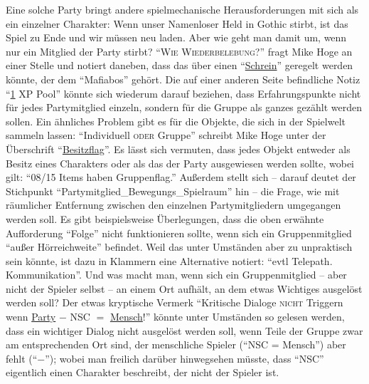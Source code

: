 \documentclass[a5paper,pagesize]{scrbook}
\begin{document}
Eine solche Party bringt andere spielmechanische Herausforderungen mit sich als ein einzelner Charakter:
Wenn unser Namenloser Held in Gothic stirbt, ist das Spiel zu Ende und wir müssen neu laden.
Aber wie geht man damit um, wenn nur ein Mitglied der Party stirbt?
\enquote{\textsc{Wie Wiederbelebung?}} fragt Mike Hoge an einer Stelle und notiert daneben, dass das über einen \enquote{\uline{Schrein}} geregelt werden könnte, der dem \enquote{Mafiabos} gehört.\autocite[S.~7]{orpheus_b_scribbles}
Die auf einer anderen Seite befindliche Notiz \enquote{\uline{1} XP Pool}\autocite[S.~8]{orpheus_b_scribbles} könnte sich wiederum darauf beziehen, dass Erfahrungspunkte nicht für jedes Partymitglied einzeln, sondern für die Gruppe als ganzes gezählt werden sollen.
Ein ähnliches Problem gibt es für die Objekte, die sich in der Spielwelt sammeln lassen:
\enquote{Individuell \textsc{oder} Gruppe} schreibt Mike Hoge unter der Überschrift \enquote{\uline{Besitzflag}}.
Es lässt sich vermuten, dass jedes Objekt entweder als Besitz eines Charakters oder als das der Party ausgewiesen werden sollte, wobei gilt:
\enquote{08/15 Items haben Gruppenflag.}\autocite[S.~9]{orpheus_b_scribbles}
Außerdem stellt sich -- darauf deutet der Stichpunkt \enquote{Partymitglied\_Bewegungs\_Spielraum}\autocite[S.~8]{orpheus_b_scribbles} hin -- die Frage, wie mit räumlicher Entfernung zwischen den einzelnen Partymitgliedern umgegangen werden soll.
Es gibt beispielsweise Überlegungen, dass die oben erwähnte Aufforderung \enquote{Folge} nicht funktionieren sollte, wenn sich ein Gruppenmitglied \enquote{außer Hörreichweite} befindet.
Weil das unter Umständen aber zu unpraktisch sein könnte, ist dazu in Klammern eine Alternative notiert:
\enquote{evtl Telepath. Kommunikation}.\autocite[S.~5]{orpheus_interface}
Und was macht man, wenn sich ein Gruppenmitglied -- aber nicht der Spieler selbst -- an einem Ort aufhält, an dem etwas Wichtiges ausgelöst werden soll?
Der etwas kryptische Vermerk \enquote{Kritische Dialoge \textsc{nicht} Triggern wenn \uline{Party} $-$ NSC $=$ \uline{Mensch}!}\autocite[S.~9]{orpheus_b_scribbles} könnte unter Umständen so gelesen werden, dass ein wichtiger Dialog nicht ausgelöst werden soll, wenn Teile der Gruppe zwar am entsprechenden Ort sind, der menschliche Spieler (\enquote{NSC = Mensch}) aber fehlt (\enquote{$-$}); wobei man freilich darüber hinwegsehen müsste, dass \enquote{NSC} eigentlich einen Charakter beschreibt, der nicht der Spieler ist.
\end{document}
